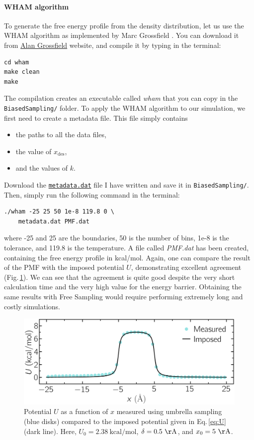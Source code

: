 \documentclass[9pt,tutorial]{livecoms}
\newcommand{\flrcmd}[1]{\textcolor{command}{\texttt{#1}}} %
\newcommand{\dwlcmd}[1]{\textcolor{download}{\texttt{#1}}} %
\newcommand{\filepath}{https://raw.githubusercontent.com/lammpstutorials/lammpstutorials-article/main/files/}
\begin{document}
\paragraph{WHAM algorithm}
\noindent To generate the free energy profile from the density distribution,
let us use the WHAM algorithm as implemented by Marc Grossfield \cite{grossfieldimplementation}.
You can download it from \href{http://membrane.urmc.rochester.edu/?page_id=126}{Alan Grossfield}
website, and compile it by typing in the terminal:
\begin{lstlisting}
cd wham
make clean
make
\end{lstlisting}
\noindent The compilation creates an executable called \textit{wham} that you can
copy in the \flrcmd{BiasedSampling/} folder. To apply the WHAM algorithm to our
simulation, we first need to create a metadata file. This file simply contains
\begin{itemize}
\item the paths to all the data files,
\item the value of $x_\text{des}$,
\item and the values of $k$.
\end{itemize}
Download the \href{\filepath tutorial7/metadata.dat}{\dwlcmd{metadata.dat}}
file I have written and save it in \flrcmd{BiasedSampling/}. Then, simply run the
following command in the terminal:
\begin{lstlisting}
./wham -25 25 50 1e-8 119.8 0 \
    metadata.dat PMF.dat
\end{lstlisting}
where -25 and 25 are the boundaries, 50 is the number of bins, 1e-8 is the tolerance,
and 119.8 is the temperature. A file called \textit{PMF.dat} has been created,
containing the free energy profile in kcal/mol. Again, one can compare the result of
the PMF with the imposed potential $U$, demonstrating excellent agreement
(Fig.\,\ref{fig:US-freenergy}). We can see that the agreement is quite good despite
the very short calculation time and the very high value for the energy barrier.
Obtaining the same results with Free Sampling would require performing extremely
long and costly simulations.

\begin{figure}
\centering
\includegraphics[width=\linewidth]{US-freenergy}
\caption{Potential $U$ as a function of $x$ measured using umbrella sampling
(blue disks) compared to the imposed potential given in Eq.\,\eqref{eq:U}
(dark line). Here, $U_0 = 2.38~\text{kcal/mol}$, $\delta = 0.5~\mathrm{\AA{}}$,
and $x_0 = 5~\mathrm{\AA{}}$.}
\label{fig:US-freenergy}
\end{figure}
\end{document}
